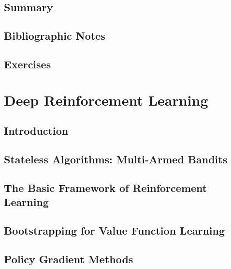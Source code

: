 \documentclass[a4paper]{article}
\begin{document}
\subsection{Summary}


\subsection{Bibliographic Notes}

\subsection{Exercises}

\newpage
\section{Deep Reinforcement Learning}
\subsection{Introduction}

\subsection{Stateless Algorithms: Multi-Armed Bandits}

\subsection{The Basic Framework of Reinforcement Learning}

\subsection{Bootstrapping for Value Function Learning}

\subsection{Policy Gradient Methods}
\end{document}
